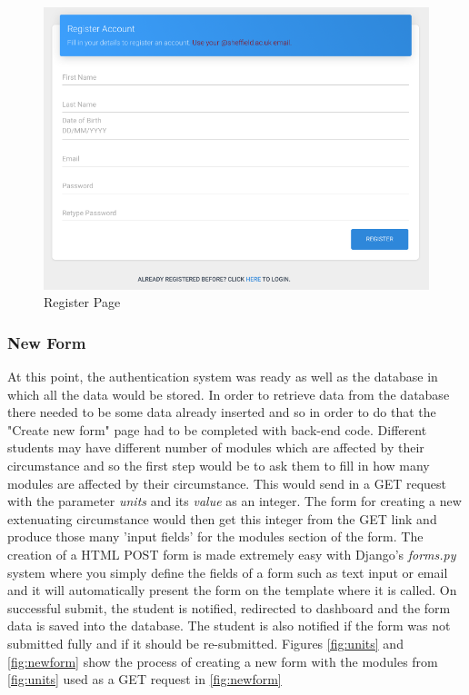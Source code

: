 \documentclass[../main.tex]{subfiles}
\begin{document}
\begin{figure}[H]
	\begin{center}
        \includegraphics[scale=1]
        {images/register.png}
        \caption{\label{fig:register} Register Page}
     \end{center} 
      \end{figure}
 

\subsubsection{New Form}
At this point, the authentication system was ready as well as the database in which all the data would be stored. In order to retrieve data from the database there needed to be some data already inserted and so in order to do that the "Create new form" page had to be completed with back-end code. Different students may have different number of modules which are affected by their circumstance and so the first step would be to ask them to fill in how many modules are affected by their circumstance. This would send in a GET request with the parameter \textit{units} and its \textit{value} as an integer. The form for creating a new extenuating circumstance would then get this integer from the GET link and produce those many 'input fields' for the modules section of the form. The creation of a HTML POST form is made extremely easy with Django's \textit{forms.py} system where you simply define the fields of a form such as text input or email and it will automatically present the form on the template where it is called. On successful submit, the student is notified, redirected to dashboard and the form data is saved into the database. The student is also notified if the form was not submitted fully and if it should be re-submitted. Figures \ref{fig:units} and \ref{fig:newform} show the process of creating a new form with the modules from \ref{fig:units} used as a GET request in \ref{fig:newform}
\end{document}
